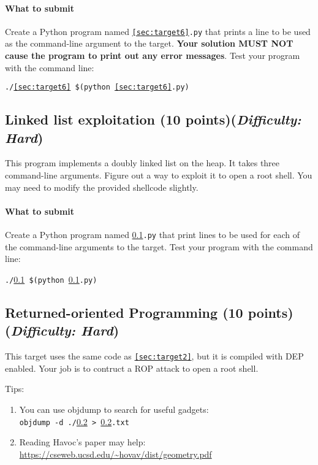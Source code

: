 \documentclass[letterpaper,12pt]{report}
\begin{document}
{\paragraph{What to submit}
Create a Python program named \texttt{\ref{sec:target6}.py} that prints a line to be used as the command-line argument to the target. \textbf{Your solution MUST NOT cause the program to print out any error messages}. Test your program with the command line:

\smallskip

\quad\texttt{./\ref{sec:target6} \$(python \ref{sec:target6}.py)}

\subsection{Linked list exploitation (10 points)\hfill\rm\normalsize (\emph{Difficulty: Hard})}
\label{sec:target7}

This program implements a doubly linked list on the heap.  It takes three command-line arguments.  Figure out a way to exploit it to open a root shell.  You may need to modify the provided shellcode slightly.

\paragraph{What to submit}
Create a Python program named \texttt{\ref{sec:target7}.py} that print lines to be used for each of the command-line arguments to the target. Test your program with the command line:

\smallskip

\quad\texttt{./\ref{sec:target7} \$(python \ref{sec:target7}.py)}

\subsection{Returned-oriented Programming (10 points)\hfill\rm\normalsize (\emph{Difficulty: Hard})}
\label{sec:target8}

This target uses the same code as \texttt{\ref{sec:target2}}, but it is compiled with DEP enabled. Your job is to contruct a ROP attack to open a root shell. 

\smallskip

Tips:
\begin{enumerate}
\item You can use objdump to search for useful gadgets: \\ \texttt{objdump -d ./\ref{sec:target8} > \ref{sec:target8}.txt}
\item Reading Havoc's paper may help: \url{https://cseweb.ucsd.edu/~hovav/dist/geometry.pdf}


\end{enumerate}}
\end{document}
